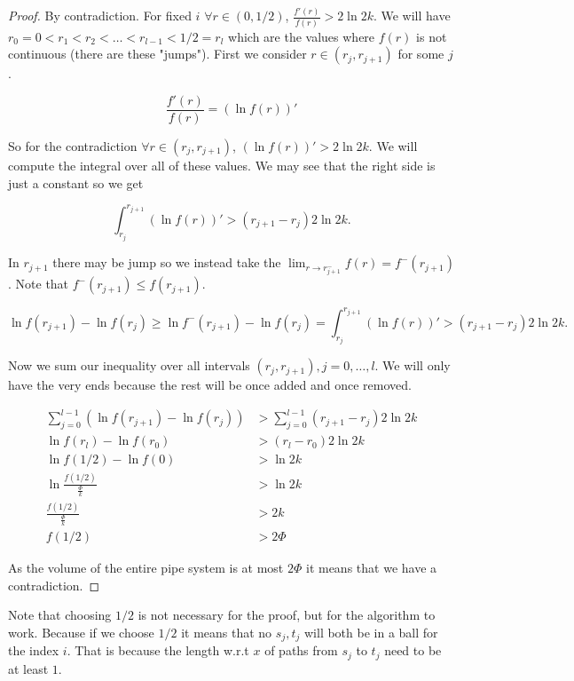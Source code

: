 \begin{proof}
	By contradiction. For fixed $i$ $\forall r \in (0, 1/2)$, $\frac{f'(r)}{f(r)} > 2 \ln 2k$. We will have $r_{0} = 0 < r_{1} < r_{2} < \dots < r_{l-1} < 1/2 = r_{l}$ which are the values where $f(r)$ is not continuous (there are these "jumps"). First we consider $r \in (r_{j}, r_{j+1})$ for some $j$.
	
	$$
	\frac{f'(r)}{f(r)} = \left( \ln f(r)\right)'
	$$
	
	So for the contradiction $\forall r \in (r_{j}, r_{j+1})$, $\left( \ln f(r)\right)' > 2 \ln 2k$. We will compute the integral over all of these values. We may see that the right side is just a constant so we get
	
	$$
	\int_{r_{j}}^{r_{j+1}} \left( \ln f(r)\right)' > (r_{j+1} - r_{j}) 2 \ln 2k.
	$$
	
	In $r_{j+1}$ there may be jump so we instead take the $\lim_{r \to r_{j+1}^{-}} f(r) = f^{-}(r_{j+1})$. Note that $f^{-}(r_{j+1}) \leq f(r_{j+1})$.
	
	$$
	\ln f(r_{j+1}) - \ln f(r_{j}) \geq \ln f^{-}(r_{j+1}) - \ln f(r_{j}) = \int_{r_{j}}^{r_{j+1}} \left( \ln f(r)\right)' > (r_{j+1} - r_{j}) 2 \ln 2k.
	$$
	
	Now we sum our inequality over all intervals $(r_{j}, r_{j+1}), j = 0, \dots, l$. We will only have the very ends because the rest will be once added and once removed.
	
	$$
	\begin{aligned}
		\sum_{j = 0}^{l-1} \left( \ln f(r_{j+1}) - \ln f(r_{j}) \right) &> \sum_{j = 0}^{l-1} (r_{j+1} - r_{j}) 2 \ln 2k\\
		\ln f(r_{l}) - \ln f(r_{0}) &> (r_{l} - r_{0}) 2 \ln 2k\\
		\ln f(1/2) - \ln f(0) &> \ln 2k\\
		\ln \frac{f(1/2)}{\frac{\Phi}{k}} &> \ln 2k\\
		\frac{f(1/2)}{\frac{\Phi}{k}} &> 2k\\
		f(1/2) &> 2 \Phi
	\end{aligned}
	$$
	
	As the volume of the entire pipe system is at most $2 \Phi$ it means that we have a contradiction.
\end{proof}

Note that choosing $1/2$ is not necessary for the proof, but for the algorithm to work. Because if we choose $1/2$ it means that no $s_{j}, t_{j}$ will both be in a ball for the index $i$. That is because the length w.r.t $x$ of paths from $s_{j}$ to $t_{j}$ need to be at least $1$.

